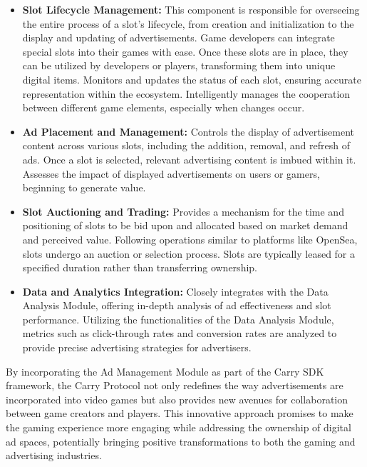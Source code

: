 \begin{itemize}
    \item  \textbf{Slot Lifecycle Management:} This component is responsible for overseeing the entire process of a slot's lifecycle, from creation and initialization to the display and updating of advertisements. Game developers can integrate special slots into their games with ease. Once these slots are in place, they can be utilized by developers or players, transforming them into unique digital items. Monitors and updates the status of each slot, ensuring accurate representation within the ecosystem. Intelligently manages the cooperation between different game elements, especially when changes occur.

\item  \textbf{Ad Placement and Management:} Controls the display of advertisement content across various slots, including the addition, removal, and refresh of ads. Once a slot is selected, relevant advertising content is imbued within it. Assesses the impact of displayed advertisements on users or gamers, beginning to generate value.

\item  \textbf{Slot Auctioning and Trading:} Provides a mechanism for the time and positioning of slots to be bid upon and allocated based on market demand and perceived value. Following operations similar to platforms like OpenSea, slots undergo an auction or selection process. Slots are typically leased for a specified duration rather than transferring ownership.

\item  \textbf{Data and Analytics Integration:} Closely integrates with the Data Analysis Module, offering in-depth analysis of ad effectiveness and slot performance. Utilizing the functionalities of the Data Analysis Module, metrics such as click-through rates and conversion rates are analyzed to provide precise advertising strategies for advertisers.
\end{itemize}
By incorporating the Ad Management Module as part of the Carry SDK framework, the Carry Protocol not only redefines the way advertisements are incorporated into video games but also provides new avenues for collaboration between game creators and players. This innovative approach promises to make the gaming experience more engaging while addressing the ownership of digital ad spaces, potentially bringing positive transformations to both the gaming and advertising industries.

